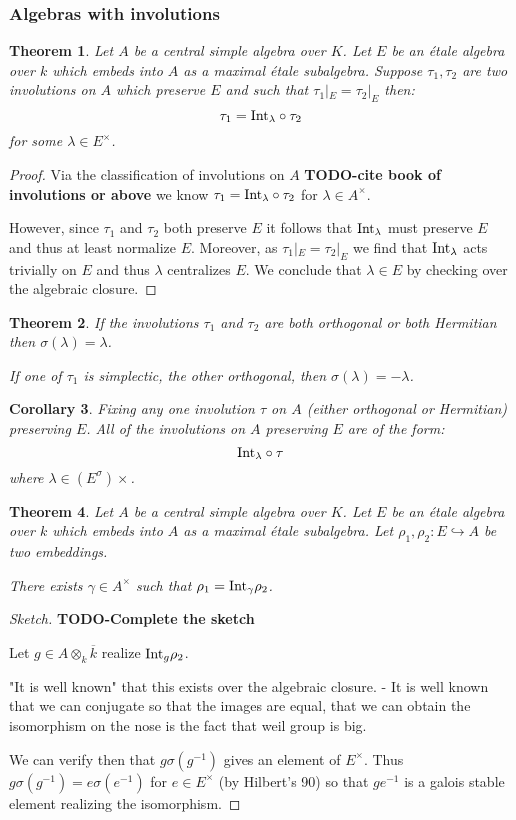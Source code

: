 \documentclass{article}
\theoremstyle{plain}
\newtheorem{theorem}{Theorem}[section]
\newtheorem{corollary}[theorem]{Corollary}
\theoremstyle{definition}
\numberwithin{equation}{section}
\newcommand{\TODO}[1]{\textbf{TODO-#1}}
\begin{document}
\subsubsection{Algebras with involutions}

\begin{theorem}
Let $A$ be a central simple algebra over $K$.
Let $E$ be an \'etale algebra over $k$ which embeds into $A$ as a maximal \'etale subalgebra.
Suppose $\tau_1,\tau_2$ are two involutions on $A$ which preserve $E$ and such that $\tau_1|_E = \tau_2|_E$ then:
\[ \tau_1 = {\rm Int}_\lambda\circ\tau_2 \]
for some $\lambda \in E^\times$.
\end{theorem}
\begin{proof}
Via the classification of involutions on $A$
\TODO{cite book of involutions or above}
 we know $\tau_1 = {\rm Int}_\lambda\circ\tau_2$ for $\lambda \in A^\times$.

However, since $\tau_1$ and $\tau_2$ both preserve $E$ it follows that ${\rm Int}_\lambda$ must preserve $E$ and thus at least normalize $E$.
Moreover, as $\tau_1|_E = \tau_2|_E$ we find that ${\rm Int}_\lambda$ acts trivially on $E$ and thus $\lambda$ centralizes $E$. We conclude that $\lambda\in E$ by checking over the algebraic closure.
\end{proof}

\begin{theorem}
If the involutions $\tau_1$ and $\tau_2$ are both orthogonal or both Hermitian then $\sigma(\lambda) = \lambda$.

If one of $\tau_1$ is simplectic, the other orthogonal, then $\sigma(\lambda) = -\lambda$.
\end{theorem}

\begin{corollary}
Fixing any one involution $\tau$ on $A$ (either orthogonal or Hermitian) preserving $E$.
All of the involutions on $A$ preserving $E$ are of the form:
\[ {\rm Int}_\lambda\circ\tau \]
where $\lambda \in (E^\sigma)\times$.
\end{corollary}

\begin{theorem}
Let $A$ be a central simple algebra over $K$.
Let $E$ be an \'etale algebra over $k$ which embeds into $A$ as a maximal \'etale subalgebra.
Let $\rho_1,\rho_2 : E\hookrightarrow A$ be two embeddings.

There exists $\gamma \in A^\times$ such that $\rho_1 = {\rm Int}_\gamma\rho_2$.
\end{theorem}
\begin{proof}[Sketch]
\TODO{Complete the sketch}

Let $g\in A \otimes_k \overline{k}$ realize ${\rm Int}_g\rho_2$.

"It is well known" that this exists over the algebraic closure.
  - It is well known that we can conjugate so that the images are equal, that we can obtain the isomorphism on the nose is the fact that weil group is big.

We can verify then that $g\sigma(g^{-1})$ gives an element of $E^\times$.
Thus $g\sigma(g^{-1}) = e\sigma(e^{-1})$ for $e\in E^\times$ (by Hilbert's 90) so that $ge^{-1}$ is a galois stable element realizing the isomorphism.
\end{proof}
\end{document}
